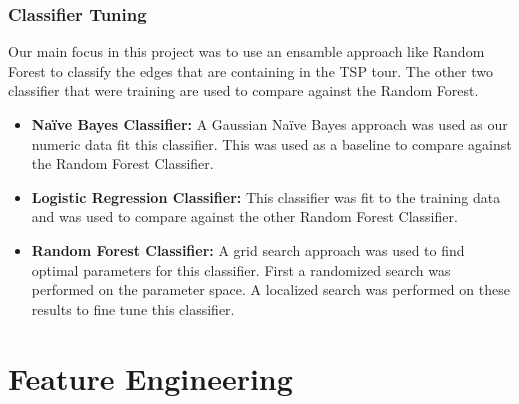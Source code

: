 \documentclass[]{UCD_CS_FYP_Report}
\begin{document}
\subsection{Classifier Tuning}
Our main focus in this project was to use an ensamble approach like Random Forest to classify the edges that are containing in the TSP tour. The other two classifier that were training are used to compare against the Random Forest.
\begin{itemize}
    \item \textbf{Naïve Bayes Classifier: \newline}
        A Gaussian Naïve Bayes approach was used as our numeric data fit this classifier. This was used as a baseline to compare against the Random Forest Classifier.
    \item \textbf{Logistic Regression Classifier: \newline}
        This classifier was fit to the training data and was used to compare against the other Random Forest Classifier.
    \item \textbf{Random Forest Classifier: \newline}
        A grid search approach was used to find optimal parameters for this classifier. First a randomized search was performed on the parameter space. A localized search was performed on these results to fine tune this classifier.
\end{itemize}



\chapter{Feature Engineering}\label{Feature_Engineering}
\end{document}

